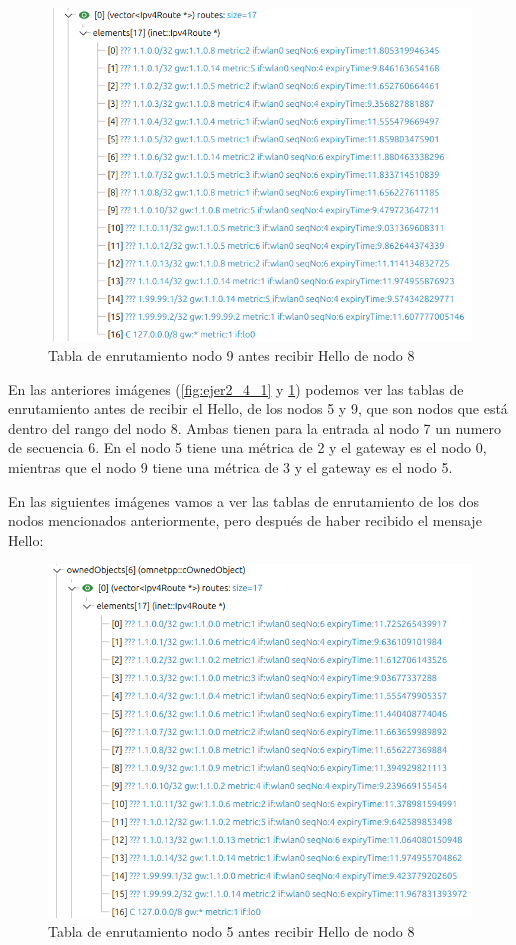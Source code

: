 \begin{figure}[H]
    \centering
    \includegraphics[width=115mm, scale=0.75]{imaxes/dsdv/ejercicio2_4_nodo9.png}
    \caption{Tabla de enrutamiento nodo 9 antes recibir Hello de nodo 8}
    \label{fig:ejer2_4_2}
\end{figure}

En las anteriores imágenes (\ref{fig:ejer2_4_1} y \ref{fig:ejer2_4_2}) podemos ver las tablas de enrutamiento antes de recibir el Hello, de los nodos 5 y 9, que son nodos que está dentro del rango del nodo 8. Ambas tienen para la entrada al nodo 7 un numero de secuencia 6. En el nodo 5 tiene una métrica de 2 y el gateway es el nodo 0, mientras que el nodo 9 tiene una métrica de 3 y el gateway es el nodo 5. 

En las siguientes imágenes vamos a ver las tablas de enrutamiento de los dos nodos mencionados anteriormente, pero después de haber recibido el mensaje Hello:

\begin{figure}[H]
    \centering
    \includegraphics[width=115mm, scale=0.75]{imaxes/dsdv/ejercicio2_4_1_nodo5.png}
    \caption{Tabla de enrutamiento nodo 5 antes recibir Hello de nodo 8}
    \label{fig:ejer2_4_3}
\end{figure}

